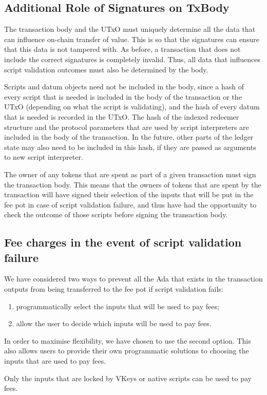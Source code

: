 \subsection{Additional Role of Signatures on TxBody}

The transaction body and the UTxO must uniquely determine all the data
that can influence on-chain transfer of value.
This is so that the signatures can ensure that this data is not tampered with.
As before, a transaction that does not include the correct signatures is completely invalid.
Thus, all data that influences script validation outcomes must also be determined by the body.

Scripts and datum objects need not be included in the body,
since a hash of every script that is needed
is included in the body of the transaction or the UTxO (depending on what the script is validating),
and the hash of every datum that is needed is recorded in the UTxO.
%
The hash of the indexed redeemer structure and the protocol parameters that are used by
script interpreters are included in the body of the transaction. In the future, other parts of the ledger
state may also need to be included in this hash, if they are passed as
arguments to new script interpreter.

The owner of any tokens that are spent as part of a given transaction
must sign the transaction body. This means that
the owners of tokens that are spent by the transaction will have
signed their selection of the inputs that will be put in the fee pot in case of script validation failure, and
thus have had the opportunity to check the outcome of those scripts before signing the transaction body.

\subsection{Fee charges in the event of script validation failure}

We have considered two ways to prevent all the Ada that exists in the transaction outputs from being transferred to
the fee pot if script validation fails:
%
\begin{enumerate}
  \item programmatically select the inputs that will be used to pay fees;
  \item allow the user to decide which inputs will be used to pay fees.
\end{enumerate}
%
In order to maximise flexibility, we have chosen to use the second option.
This also allows users to provide their own programmatic solutions to choosing the inputs that are used to pay fees.

Only the inputs that are locked by VKeys or native scripts can
be used to pay fees.
